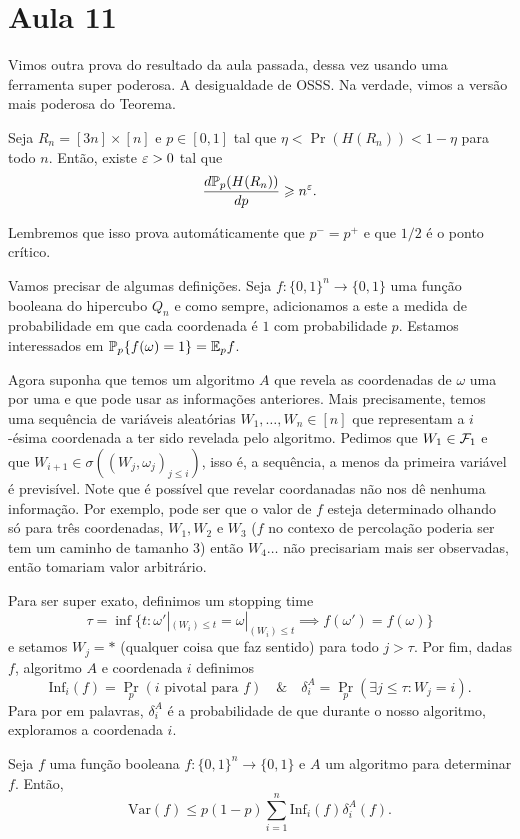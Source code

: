 \section{Aula 11}

Vimos outra prova do resultado da aula passada,
dessa vez usando uma ferramenta super poderosa. A desigualdade de OSSS.
Na verdade, vimos a versão mais poderosa do Teorema.
\begin{theorem}
	\label{trm:sharp_crossing_transition}
	Seja $R_n = [3n]\times[n]$ e $p \in [0,1]$ tal que $\eta <
	\Pr(H(R_n)) < 1 - \eta$
	para todo $n$. Então, existe $\varepsilon > 0$ tal que
	\[
		\frac{d\mathbb{P}_p(H(R_n))}{dp} \geqslant n^{\varepsilon}.
	\]
\end{theorem}
Lembremos que isso prova automáticamente que $p^{-} = p^+$ e que
$1/2$ é o ponto crítico.

Vamos precisar de algumas definições.
Seja $f : \{0,1\}^n \to \{0,1\}$ uma função booleana do hipercubo $Q_n$ e
como sempre, adicionamos a este a medida de probabilidade em que cada coordenada
é $1$ com probabilidade $p$. Estamos interessados em  $\mathbb{P}_p
\{f(\omega) = 1\} = \mathbb{E}_p f$.

Agora suponha que temos um algoritmo $A$ que revela as coordenadas de $\omega$
uma por uma e que pode usar as informações anteriores. Mais precisamente,
temos uma sequência de variáveis aleatórias $W_1, \dots, W_n \in [n]$
que representam a $i$-ésima coordenada a ter sido revelada pelo algoritmo.
Pedimos que $W_1 \in \mathcal{F}_1$ e que $W_{i+1} \in \sigma((W_j,
\omega_j)_{j \leq i})$, isso é,
a sequência, a menos da primeira variável é previsível. Note que é possível que
revelar coordanadas não nos dê nenhuma informação. Por exemplo,
pode ser que o valor de $f$ esteja determinado olhando só para três coordenadas,
$W_1, W_2$ e $W_3$ ($f$ no contexo de percolação poderia ser tem um
caminho de tamanho $3$)
então $W_4 \dots$ não precisariam mais ser observadas, então tomariam
valor arbitrário.

Para ser super exato, definimos um stopping time
\[
	\tau = \inf \{t : \omega'|_{(W_i)\leq t} = \omega|_{(W_i) \leq t}
	\implies f(\omega') = f(\omega)\}
\]
e setamos $W_j = *$ (qualquer coisa que faz sentido) para todo $j > \tau$.
Por fim, dadas $f$, algoritmo $A$ e coordenada $i$ definimos
\[
	\text{Inf}_i(f) = \Pr_p(i \text { pivotal para } f) \quad \& \quad
	\delta_i^A = \Pr_p(\exists j \leq \tau : W_j = i).
\]
Para por em palavras, $\delta_i^A$ é a probabilidade de que durante o
nosso algoritmo,
exploramos a coordenada $i$.

\begin{theorem}[OSSS]
	\label{trm:osss}
	Seja $f$ uma função booleana $f : \{0,1\}^n \to \{0,1\}$ e $A$ um algoritmo
	para determinar $f$. Então,
	\[
		\text{Var}(f) \leq p(1-p) \sum_{i = 1}^n \text{Inf}_i(f) \delta_i^A(f).
	\]
\end{theorem}

